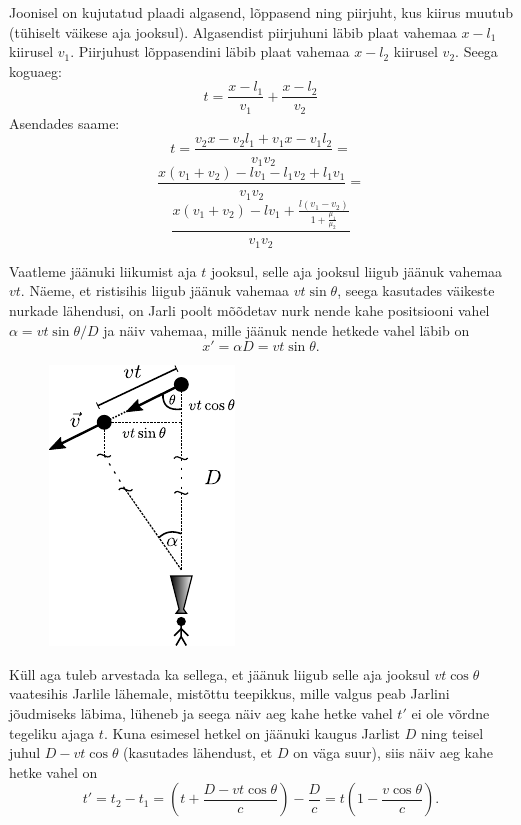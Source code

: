 \documentclass[10pt]{article}
\begin{document}
Joonisel on kujutatud plaadi algasend, lõppasend ning piirjuht, kus kiirus muutub (tühiselt väikese aja jooksul). Algasendist piirjuhuni läbib plaat vahemaa $x - l_1$ kiirusel $v_1$. Piirjuhust lõppasendini läbib plaat vahemaa $x - l_2$ kiirusel $v_2$. Seega koguaeg:
$$t = \frac{x - l_1}{v_1} + \frac{x - l_2}{v_2}$$
Asendades saame:
$$t=\frac{v_2 x - v_2 l_1 + v_1 x - v_1 l_2}{v_1 v_2} =$$
$$\frac{x(v_1 + v_2) - lv_1 - l_1 v_2 + l_1 v_1}{v_1 v_2} =$$
$$\frac{x(v_1 + v_2) - lv_1 + \frac{l(v_1 - v_2)}{1+\frac{\mu_{1}}{\mu_{2}}}}{v_1 v_2}$$
\probend
\bigskip


\solu
Vaatleme jäänuki liikumist aja $t$ jooksul, selle aja jooksul liigub jäänuk vahemaa $vt$. Näeme, et ristisihis liigub jäänuk vahemaa $vt \sin \theta$, seega kasutades väikeste nurkade lähendusi, on Jarli poolt mõõdetav nurk nende kahe positsiooni vahel $\alpha = vt\sin\theta/D$ ja näiv vahemaa, mille jäänuk nende hetkede vahel läbib on
\begin{equation*}
	x' = \alpha D = vt\sin\theta.
\end{equation*}

\begin{figure}[h]
\centering
\includegraphics[width=0.25\linewidth]{2020-lahg-04-yl.pdf}
\end{figure}

Küll aga tuleb arvestada ka sellega, et jäänuk liigub selle aja jooksul $vt \cos\theta$ vaatesihis Jarlile lähemale, mistõttu teepikkus, mille valgus peab Jarlini jõudmiseks läbima, lüheneb ja seega näiv aeg kahe hetke vahel $t'$ ei ole võrdne tegeliku ajaga $t$. Kuna esimesel hetkel on jäänuki kaugus Jarlist $D$ ning teisel juhul $D-vt\cos\theta$ (kasutades lähendust, et $D$ on väga suur), siis näiv aeg kahe hetke vahel on
\begin{equation*}
t' = t_2 - t_1 = \left(t + \frac{D-vt\cos\theta}{c}\right) - \frac{D}{c} = t\left(1 - \frac{v\cos\theta}{c}\right).
\end{equation*}
\end{document}
